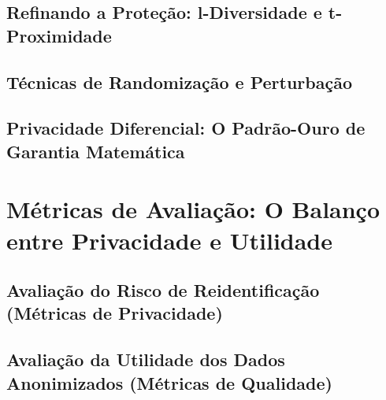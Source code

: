 \subsection{Refinando a Proteção: l-Diversidade e t-Proximidade}
\label{subsec:fund-l-diversidade}

\subsection{Técnicas de Randomização e Perturbação}
\label{subsec:fund-randomizacao}

\subsection{Privacidade Diferencial: O Padrão-Ouro de Garantia Matemática}
\label{subsec:fund-privacidade-diferencial}

\section{Métricas de Avaliação: O Balanço entre Privacidade e Utilidade}
\label{sec:fund-metricas}

\subsection{Avaliação do Risco de Reidentificação (Métricas de Privacidade)}
\label{subsec:fund-metricas-privacidade}

\subsection{Avaliação da Utilidade dos Dados Anonimizados (Métricas de Qualidade)}
\label{subsec:fund-metricas-utilidade}


